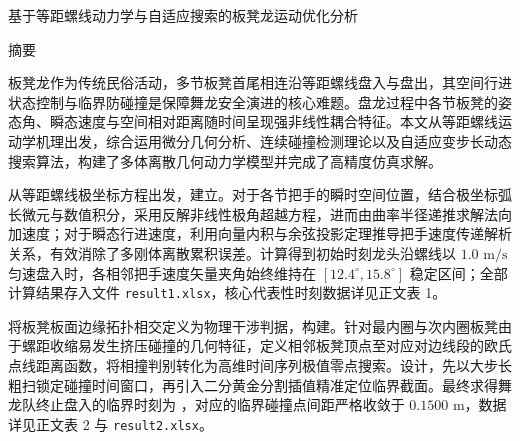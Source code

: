 
\begin{center}
    \vspace*{0.6cm}
    {\titlefont 基于等距螺线动力学与自适应搜索的板凳龙运动优化分析\par}
    \vspace{0.4cm}
\end{center}

\begin{center}
    {\sectiontitlefont 摘\quad 要}
\end{center}

\vspace{0.3cm}
\bodyfont

\indent 板凳龙作为传统民俗活动，多节板凳首尾相连沿等距螺线盘入与盘出，其空间行进状态控制与临界防碰撞是保障舞龙安全演进的核心难题。盘龙过程中各节板凳的姿态角、瞬态速度与空间相对距离随时间呈现强非线性耦合特征。本文从等距螺线运动学机理出发，综合运用微分几何分析、连续碰撞检测理论以及自适应变步长动态搜索算法，构建了多体离散几何动力学模型并完成了高精度仿真求解。

\indent {} 从等距螺线极坐标方程出发，建立。对于各节把手的瞬时空间位置，结合极坐标弧长微元与数值积分，采用反解非线性极角超越方程，进而由曲率半径递推求解法向加速度；对于瞬态行进速度，利用向量内积与余弦投影定理推导把手速度传递解析关系，有效消除了多刚体离散累积误差。计算得到初始时刻龙头沿螺线以 $1.0\text{ m/s}$ 匀速盘入时，各相邻把手速度矢量夹角始终维持在 $[12.4^\circ, 15.8^\circ]$ 稳定区间；全部计算结果存入文件 \texttt{result1.xlsx}，核心代表性时刻数据详见正文表 1。

\indent {} 将板凳板面边缘拓扑相交定义为物理干涉判据，构建。针对最内圈与次内圈板凳由于螺距收缩易发生挤压碰撞的几何特征，定义相邻板凳顶点至对应对边线段的欧氏点线距离函数，将相撞判别转化为高维时间序列极值零点搜索。设计，先以大步长粗扫锁定碰撞时间窗口，再引入二分黄金分割插值精准定位临界截面。最终求得舞龙队终止盘入的临界时刻为 ，对应的临界碰撞点间距严格收敛于 $0.1500\text{ m}$，数据详见正文表 2 与 \texttt{result2.xlsx}。

